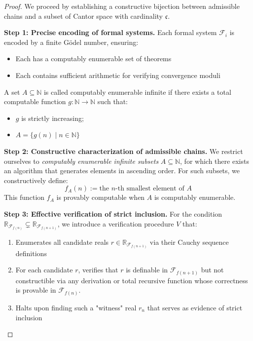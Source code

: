 \documentclass[12pt]{article}
\theoremstyle{definition}
\theoremstyle{plain}
\theoremstyle{remark}
\begin{document}
\begin{proof}
We proceed by establishing a constructive bijection between admissible chains and a subset of Cantor space with cardinality \( \mathfrak{c} \).

\textbf{Step 1: Precise encoding of formal systems.} 
Each formal system \( \mathcal{F}_i \) is encoded by a finite Gödel number, ensuring:
\begin{itemize}
    \item Each has a computably enumerable set of theorems
    \item Each contains sufficient arithmetic for verifying convergence moduli
\end{itemize}

A set \( A \subseteq \mathbb{N} \) is called computably enumerable infinite if there exists a total computable function \( g: \mathbb{N} \to \mathbb{N} \) such that:
\begin{itemize}
    \item \( g \) is strictly increasing;
    \item \( A = \{ g(n) \mid n \in \mathbb{N} \} \)
\end{itemize}

\textbf{Step 2: Constructive characterization of admissible chains.}
We restrict ourselves to \emph{computably enumerable infinite subsets} \( A \subseteq \mathbb{N} \), for which there exists an algorithm that generates elements in ascending order. For such subsets, we constructively define:
\begin{equation}
    f_A(n) := \text{the } n\text{-th smallest element of } A
\end{equation}
This function \( f_A \) is provably computable when \( A \) is computably enumerable.

\textbf{Step 3: Effective verification of strict inclusion.}
For the condition \( \mathbb{R}_{\mathcal{F}_{f(n)}} \subsetneq \mathbb{R}_{\mathcal{F}_{f(n+1)}} \), we introduce a verification procedure \( V \) that:
\begin{enumerate}
    \item Enumerates all candidate reals \( r \in \mathbb{R}_{\mathcal{F}_{f(n+1)}} \) via their Cauchy sequence definitions
    \item For each candidate \( r \), verifies that \( r \) is definable in \( \mathcal{F}_{f(n+1)} \) but not constructible via any derivation or total recursive function whose correctness is provable in \( \mathcal{F}_{f(n)} \).
    \item Halts upon finding such a "witness" real \( r_n \) that serves as evidence of strict inclusion
\end{enumerate}


\end{proof}
\end{document}
